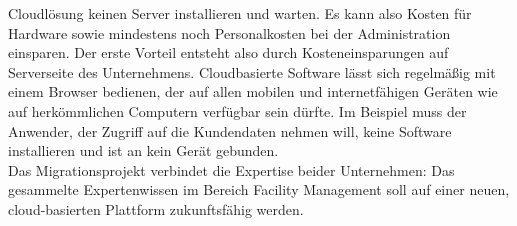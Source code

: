 Cloudlösung keinen Server installieren und warten. Es kann also Kosten für 
Hardware sowie mindestens noch Personalkosten bei der Administration einsparen. 
Der erste Vorteil entsteht also durch Kosteneinsparungen auf Serverseite des 
Unternehmens. Cloudbasierte Software lässt sich regelmäßig mit einem Browser 
bedienen, der auf allen mobilen und internetfähigen Geräten wie auf 
herkömmlichen Computern verfügbar sein dürfte. Im Beispiel muss der Anwender, 
der Zugriff auf die Kundendaten nehmen will, keine Software installieren und 
ist an kein Gerät gebunden.\\
Das Migrationsprojekt verbindet die Expertise beider Unternehmen: Das 
gesammelte Expertenwissen im Bereich Facility Management soll auf einer neuen, 
cloud-basierten Plattform zukunftsfähig werden.\\
